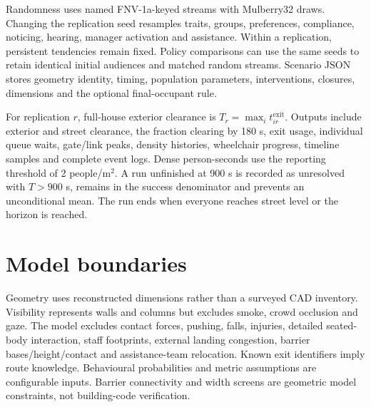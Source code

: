 \documentclass[11pt,a4paper]{article}
\begin{document}
Randomness uses named FNV-1a-keyed streams with Mulberry32 draws. Changing the replication seed resamples traits, groups, preferences, compliance, noticing, hearing, manager activation and assistance. Within a replication, persistent tendencies remain fixed. Policy comparisons can use the same seeds to retain identical initial audiences and matched random streams. Scenario JSON stores geometry identity, timing, population parameters, interventions, closures, dimensions and the optional final-occupant rule.

For replication $r$, full-house exterior clearance is $T_r=\max_i t_{ir}^{\mathrm{exit}}$. Outputs include exterior and street clearance, the fraction clearing by 180 s, exit usage, individual queue waits, gate/link peaks, density histories, wheelchair progress, timeline samples and complete event logs. Dense person-seconds use the reporting threshold of 2 people/m$^2$. A run unfinished at 900 s is recorded as unresolved with $T>900$ s, remains in the success denominator and prevents an unconditional mean. The run ends when everyone reaches street level or the horizon is reached.

\section{Model boundaries}
Geometry uses reconstructed dimensions rather than a surveyed CAD inventory. Visibility represents walls and columns but excludes smoke, crowd occlusion and gaze. The model excludes contact forces, pushing, falls, injuries, detailed seated-body interaction, staff footprints, external landing congestion, barrier bases/height/contact and assistance-team relocation. Known exit identifiers imply route knowledge. Behavioural probabilities and metric assumptions are configurable inputs. Barrier connectivity and width screens are geometric model constraints, not building-code verification.
\end{document}

